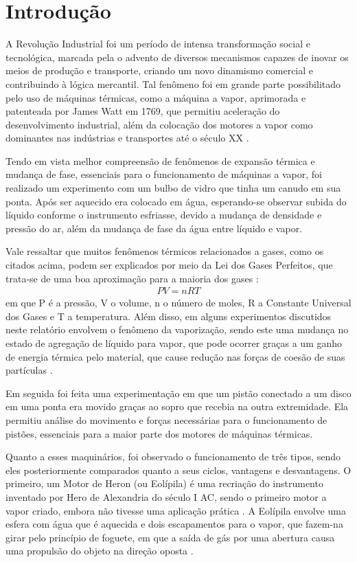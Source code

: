 \section{Introdução}

A Revolução Industrial foi um período de intensa transformação social e tecnológica, marcada pela o advento de diversos mecanismos capazes de inovar os meios de produção e transporte, criando um novo dinamismo comercial e contribuindo à lógica mercantil. Tal fenômeno foi em grande parte possibilitado pelo uso de máquinas térmicas, como a máquina a vapor, aprimorada e patenteada por James Watt em 1769, que permitiu aceleração do desenvolvimento industrial, além da colocação dos motores a vapor como dominantes nas indústrias e transportes até o século XX \cite{HistoriaEM}.

Tendo em vista melhor compreensão de fenômenos de expansão térmica e mudança de fase, essenciais para o funcionamento de máquinas a vapor, foi realizado um experimento com um bulbo de vidro que tinha um canudo em sua ponta. Após ser aquecido era colocado em água, esperando-se observar subida do líquido conforme o instrumento esfriasse, devido a mudança de densidade e pressão do ar, além da mudança de fase da água entre líquido e vapor.

Vale ressaltar que muitos fenômenos térmicos relacionados a gases, como os citados acima, podem ser explicados por meio da Lei dos Gases Perfeitos, que trata-se de uma boa aproximação para a maioria dos gases \cite{Nussenzveig_2014}:
\begin{align*}
    PV = nRT
\end{align*}
em que P é a pressão, V o volume, n o número de moles, R a Constante Universal dos Gases e T a temperatura. Além disso, em alguns experimentos discutidos neste relatório envolvem o fenômeno da vaporização, sendo este uma mudança no estado de agregação de líquido para vapor, que pode ocorrer graças a um ganho de energia térmica pelo material, que cause redução nas forças de coesão de suas partículas \cite{FisicaEM}.

Em seguida foi feita uma experimentação em que um pistão conectado a um disco em uma ponta era movido graças ao sopro que recebia na outra extremidade. Ela permitiu análise do movimento e forças necessárias para o funcionamento de pistões, essenciais para a maior parte dos motores de máquinas térmicas.

Quanto a esses maquinários, foi observado o funcionamento de três tipos, sendo eles posteriormente comparados quanto a seus ciclos, vantagens e desvantagens. O primeiro, um Motor de Heron (ou Eolípila) é uma recriação do instrumento inventado por Hero de Alexandria do século I AC, sendo o primeiro motor a vapor criado, embora não tivesse uma aplicação prática \cite{Enciclopedia}. A Eolípila envolve uma esfera com água que é aquecida e dois escapamentos para o vapor, que fazem-na girar pelo princípio de foguete, em que a saída de gás por uma abertura causa uma propulsão do objeto na direção oposta \cite{Nasa}.


